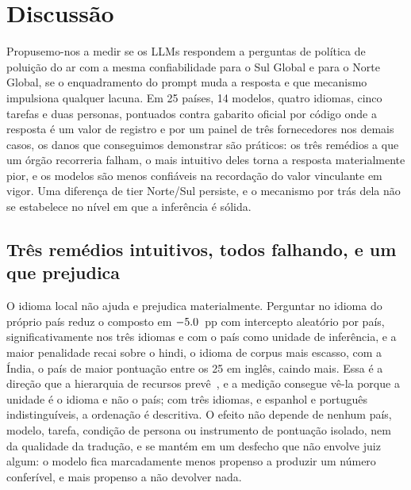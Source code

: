 \section{Discussão}
\label{sec:discussao}

Propusemo-nos a medir se os LLMs respondem a perguntas de política de poluição
do ar com a mesma confiabilidade para o Sul Global e para o Norte Global, se o
enquadramento do prompt muda a resposta e que mecanismo impulsiona qualquer
lacuna. Em 25 países, 14 modelos, quatro idiomas, cinco tarefas e duas
personas, pontuados contra gabarito oficial por código onde a resposta é um
valor de registro e por um painel de três fornecedores nos demais casos, os
danos que conseguimos demonstrar são práticos: os três remédios a que um órgão
recorreria falham, o mais intuitivo deles torna a resposta materialmente pior,
e os modelos são menos confiáveis na recordação do valor vinculante em vigor.
Uma diferença de tier Norte/Sul persiste, e o mecanismo por trás dela não se
estabelece no nível em que a inferência é sólida.

\subsection{Três remédios intuitivos, todos falhando, e um que prejudica}

O idioma local não ajuda e prejudica materialmente. Perguntar no idioma do
próprio país reduz o composto em $-5.0$~pp com intercepto aleatório
por país, significativamente nos três idiomas e com o país como unidade de
inferência, e a maior penalidade recai
sobre o hindi, o idioma de corpus mais escasso, com a Índia, o país de maior
pontuação entre os 25 em inglês, caindo mais. Essa é a direção que a
hierarquia de recursos prevê~\citep{joshi2020state,xue2021mt5}, e a medição
consegue vê-la porque a unidade é o idioma e não o país; com três idiomas, e
espanhol e português indistinguíveis, a ordenação é descritiva. O efeito não
depende de nenhum país, modelo, tarefa, condição de persona ou instrumento de
pontuação isolado, nem da qualidade da tradução, e se mantém em um desfecho que
não envolve juiz algum: o modelo fica marcadamente menos propenso a produzir um
número conferível, e mais propenso a não devolver nada.


